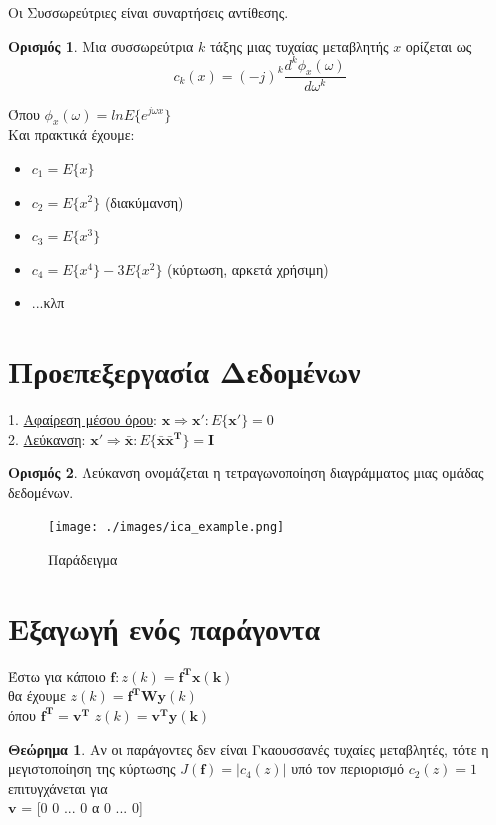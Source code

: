 \documentclass[22pt,a4paper]{article}
\theoremstyle{definition}
\newtheorem{definition}{Ορισμός}[section]
\newtheorem{theorem}{Θεώρημα}[section]
\begin{document}
Οι Συσσωρεύτριες είναι συναρτήσεις αντίθεσης.
\begin{definition}
  Μια συσσωρεύτρια $k$ τάξης μιας τυχαίας μεταβλητής $x$ ορίζεται ως
  \begin{equation}
    \boxed{
      c_k(x) = (-j)^k \frac{d^k\phi_x(\omega)}{d\omega^k}
    }
  \end{equation}

\end{definition}
Όπου $\phi_x(\omega) = lnE\{e^{j \omega x}\}$ \\

Και πρακτικά έχουμε:
\begin{itemize}
  \item $c_1 = E\{x\}$
  \item $c_2 = E\{x^2\}$ (διακύμανση)
  \item $c_3 = E\{x^3\}$
  \item $c_4 = E\{x^4\} - 3E\{x^2\}$ (κύρτωση, αρκετά χρήσιμη)
  \item ...κλπ
\end{itemize}

\section*{Προεπεξεργασία Δεδομένων}


1. \underline{Αφαίρεση μέσου όρου}: $\pmb{x\Rightarrow x': }E \{\pmb{x'}\} = 0 $ \\
2. \underline{Λεύκανση}: $\pmb{x'\Rightarrow\bar{x}:}E\{\pmb{\bar{x}\bar{x}^T\}=I}$
\begin{definition}
  Λεύκανση ονομάζεται η τετραγωνοποίηση διαγράμματος μιας ομάδας δεδομένων.
\end{definition}

\begin{figure}[h]
  \caption{Παράδειγμα}
  \centering
  \texttt{[image: ./images/ica\_example.png]}
\end{figure}

\section*{Εξαγωγή ενός παράγοντα}

Έστω για κάποιο $\pmb{f}: z(k) = \pmb{f^T x(k)}$ \\
θα έχουμε $z(k) = \pmb{f^T Wy}(k)$ \\
όπου  $\pmb{f^T} = \pmb{v^T}$ \Rightarrow $z(k) = \pmb{v^T y(k)}$

\begin{theorem}
  Αν οι παράγοντες δεν είναι Γκαουσσανές τυχαίες μεταβλητές, τότε η μεγιστοποίηση της κύρτωσης $J\pmb{(f)} = |c_4(z)| $ υπό τον περιορισμό $c_2(z)=1$ επιτυγχάνεται για \\
  $\pmb{v}$ = [0 0 ... 0 α 0 ... 0]
\end{theorem}
\end{document}
